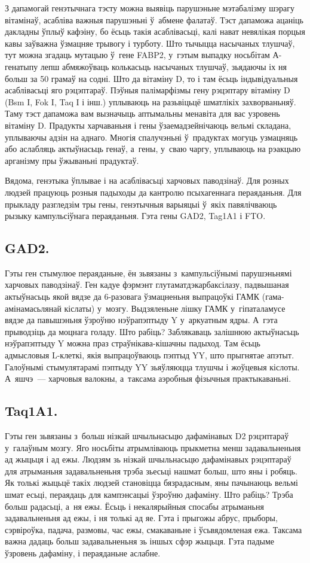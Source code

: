 З дапамогай генэтычнага тэсту можна выявіць парушэньне мэтабалізму шэрагу вітамінаў, асабліва важныя парушэньні ў~абмене фалатаў. Тэст дапаможа ацаніць дакладны ўплыў кафэіну, бо ёсьць такія асаблівасьці, калі нават невялікая порцыя кавы заўважна ўзмацняе трывогу і турботу. Што тычыцца насычаных тлушчаў, тут можна згадаць мутацыю ў~гене FABP2, у~гэтым выпадку носьбітам А-генатыпу лепш абмяжоўваць колькасьць насычаных тлушчаў, зьядаючы іх ня больш за 50 грамаў на содні. Што да вітаміну D, то і там ёсьць індывідуальныя асаблівасьці яго рэцэптараў. Пэўныя палімарфізмы гену рэцэптару вітаміну D (Bsm I, Fok I, Taq I і інш.) уплываюць на разьвіцьцё шматлікіх захворваньняў. Таму тэст дапаможа вам вызначыць аптымальны менавіта для вас узровень вітаміну D. Прадукты харчаваньня і гены ўзаемадзейнічаюць вельмі складана, уплываючы адзін на аднаго. Многія спалучэньні ў~прадуктах могуць узмацняць або аслабляць актыўнасьць генаў, а~гены, у~сваю чаргу, уплываюць на рэакцыю арганізму пры ўжываньні прадуктаў.

Вядома, генэтыка ўплывае і на асаблівасьці харчовых паводзінаў. Для розных людзей працуюць розныя падыходы да кантролю псыхагеннага пераяданьня. Для прыкладу разгледзім тры гены, генэтычныя варыяцыі ў~якіх павялічваюць рызыку кампульсіўнага пераяданьня. Гэта гены GAD2, Tag1A1 і FTO.

\subsection{GAD2.}
Гэты ген стымулюе пераяданьне, ён зьвязаны з~кампульсіўнымі парушэньнямі харчовых паводзінаў. Ген кадуе фэрмэнт глутаматдэкарбаксілазу, падвышаная актыўнасьць якой вядзе да 6-разовага ўзмацненьня выпрацоўкі ГАМК (гама-амінамасьлянай кіслаты) у~мозгу. Выдзяленьне лішку ГАМК у~гіпаталамусе вядзе да павышэньня ўзроўню нэўрапэптыду Y у~аркуатным ядры. А~гэта прыводзіць да моцнага голаду. Што рабіць? Заблякаваць залішнюю актыўнасьць нэўрапэптыду Y можна праз страўнікава-кішачны падыход. Там ёсьць адмысловыя L-клеткі, якія выпрацоўваюць пэптыд YY, што прыгнятае апэтыт. Галоўнымі стымулятарамі пэптыду YY зьяўляюцца тлушчы і жоўцевыя кіслоты. А~яшчэ~--- харчовыя валокны, а~таксама аэробныя фізычныя практыкаваньні.

\subsection{Taq1A1.}
Гэты ген зьвязаны з~больш нізкай шчыльнасьцю дафамінавых D2 рэцэптараў у~галаўным мозгу. Яго носьбіты атрымліваюць прыкметна менш задавальненьня ад жыцьця і ад ежы. Людзям зь нізкай шчыльнасьцю дафамінавых рэцэптараў для атрыманьня задавальненьня трэба зьесьці нашмат больш, што яны і робяць. Як толькі жыцьцё такіх людзей становіцца бязрадасным, яны пачынаюць вельмі шмат есьці, пераядаць для кампэнсацыі ўзроўню дафаміну. Што рабіць? Трэба больш радасьці, а~ня ежы. Ёсьць і некалярыйныя спосабы атрыманьня задавальненьня ад ежы, і ня толькі ад яе. Гэта і прыгожы абрус, прыборы, сэрвіроўка, падача, размовы, час ежы, смакаваньне і ўсьвядомленая ежа. Таксама важна дадаць больш задавальненьня зь іншых сфэр жыцьця. Гэта падыме ўзровень дафаміну, і пераяданьне аслабне.

